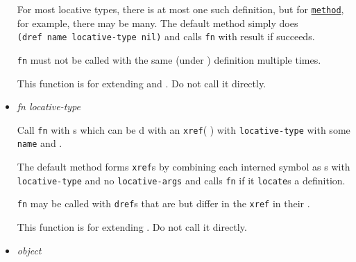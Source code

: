 \begin{itemize}
  For most locative types, there is at most one such definition, but for
  \href{http://www.lispworks.com/documentation/HyperSpec/Body/t_method.htm}{\texttt{method}},
  for example, there may be many. The default method simply does
  \texttt{(dref\ name\ locative-type\ nil)} and calls \texttt{fn} with
  result if 
  succeeds.

  \texttt{fn} must not be called with the same (under
  ) definition
  multiple times.

  This function is for extending
  and
  .
  Do not call it directly.
\item
  \label{x-28DREF-EXT-3AMAP-DEFINITIONS-OF-TYPE-20GENERIC-FUNCTION-29}
  \emph{fn locative-type}

  Call \texttt{fn} with
  s which can be
  d with an
  \texttt{xref}(
  ) with
  \texttt{locative-type} with some \texttt{name} and
  .

  The default method forms \texttt{xref}s by combining each interned
  symbol as
  s
  with \texttt{locative-type} and no \texttt{locative-args} and calls
  \texttt{fn} if it \texttt{locate}s a definition.

  \texttt{fn} may be called with \texttt{dref}s that are
   but differ
  in the \texttt{xref} in their
  .

  This function is for extending
  .
  Do not call it directly.
\item
  \label{x-28DREF-EXT-3AARGLIST-2A-20GENERIC-FUNCTION-29}
  \emph{object}


\end{itemize}
